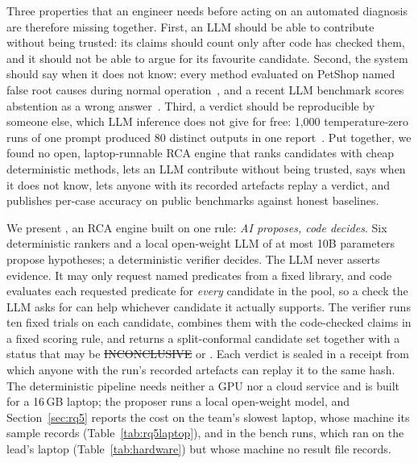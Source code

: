 Three properties that an engineer needs before acting on an automated diagnosis are therefore missing together.
First, an LLM should be able to contribute without being trusted: its claims should count only after code has checked them, and it should not be able to argue for its favourite candidate.
Second, the system should say when it does not know: every method evaluated on PetShop named false root causes during normal operation~\cite{petshop2024}, and a recent LLM benchmark scores abstention as a wrong answer~\cite{rcatlas2026}.
Third, a verdict should be reproducible by someone else, which LLM inference does not give for free: 1,000 temperature-zero runs of one prompt produced 80 distinct outputs in one report~\cite{thinkingmachinesnondeterminism}.
Put together, we found no open, laptop-runnable RCA engine that ranks candidates with cheap deterministic methods, lets an LLM contribute without being trusted, says when it does not know, lets anyone with its recorded artefacts replay a verdict, and publishes per-case accuracy on public benchmarks against honest baselines.

We present \sys, an RCA engine built on one rule: \emph{AI proposes, code decides}.
Six deterministic rankers and a local open-weight LLM of at most 10B parameters propose hypotheses; a deterministic verifier decides.
The LLM never asserts evidence.
It may only request named predicates from a fixed library, and code evaluates each requested predicate for \emph{every} candidate in the pool, so a check the LLM asks for can help whichever candidate it actually supports.
The verifier runs ten fixed trials on each candidate, combines them with the code-checked claims in a fixed scoring rule, and returns a split-conformal candidate set together with a status that may be \st{INCONCLUSIVE} or \NOFAULT.
Each verdict is sealed in a receipt from which anyone with the run's recorded artefacts can replay it to the same hash.
The deterministic pipeline needs neither a GPU nor a cloud service and is built for a 16\,GB laptop; the proposer runs a local open-weight model, and Section~\ref{sec:rq5} reports the cost on the team's slowest laptop, whose machine its sample records (Table~\ref{tab:rq5laptop}), and in the bench runs, which ran on the lead's laptop (Table~\ref{tab:hardware}) but whose machine no result file records.

